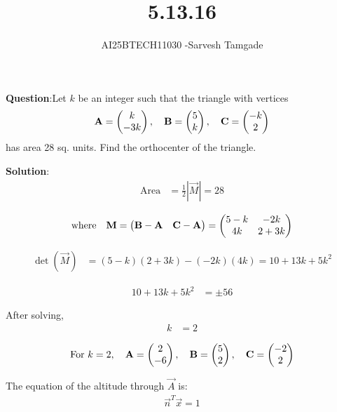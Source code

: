 \documentclass[journal]{IEEEtran}
\begin{document}

\vspace{3cm}

\title{5.13.16}
\author{AI25BTECH11030 -Sarvesh Tamgade}
{\let\newpage\relax\maketitle}

\renewcommand{\thefigure}{\theenumi}
\renewcommand{\thetable}{\theenumi}
\setlength{\intextsep}{10pt} 


\renewcommand{\thetable}{\theenumi}


\textbf{Question}:Let \( k \) be an integer such that the triangle with vertices 
\[
\mathbf{A} = \begin{pmatrix} k \\ -3k \end{pmatrix}, \quad 
\mathbf{B} = \begin{pmatrix} 5 \\ k \end{pmatrix}, \quad 
\mathbf{C} = \begin{pmatrix} -k \\ 2 \end{pmatrix}
\]
has area 28 sq. units. Find the orthocenter of the triangle.


\textbf{Solution}:  
\begin{align}
\text{Area} &= \frac{1}{2} \left| \vec{M} \right| = 28
\end{align}

\begin{align}
\text{where} \quad
\mathbf{M} = \begin{pmatrix}
\mathbf{B} - \mathbf{A} & \mathbf{C} - \mathbf{A}
\end{pmatrix}
= \begin{pmatrix}
5-k & -2k \\
4k & 2 + 3k
\end{pmatrix}
\end{align}

\begin{align}
\det(\vec{M}) &= (5-k)(2+3k) - (-2k)(4k) = 10 + 13k + 5k^2
\end{align}

\begin{align}
10 + 13k + 5k^2 &= \pm 56
\end{align}

After solving,
\begin{align}
k &= 2
\end{align}

\begin{align}
\text{For } k=2, \quad \mathbf{A} = \begin{pmatrix}2 \\ -6\end{pmatrix}, \quad \mathbf{B} = \begin{pmatrix}5 \\ 2\end{pmatrix}, \quad \mathbf{C} = \begin{pmatrix}-2 \\ 2\end{pmatrix}
\end{align}

The equation of the altitude through \( \vec{A} \) is:
\begin{align}
\vec{n}^T \vec{x} = 1
\end{align}
\end{document}
